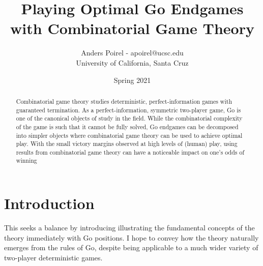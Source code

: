 \documentclass{article}
\title{Playing Optimal Go Endgames with Combinatorial Game Theory}
\author{Anders Poirel - apoirel@ucsc.edu \\ University of California, Santa Cruz}
\date{Spring 2021}
\theoremstyle{plain}
\theoremstyle{definition}
\begin{document}
\maketitle

\begin{abstract}
    Combinatorial game theory studies deterministic, perfect-information 
    games with guaranteed termination. As a perfect-information, symmetric 
    two-player game, Go is one of the canonical objects of study in the field.
    While the combinatorial complexity of the game is such that it cannot be fully solved,
    Go endgames can be decomposed into simpler objects where combinatorial game theory can 
    be used to achieve optimal play. With the small victory margins observed at high
    levels of (human) play, using results from combinatorial game theory can have a 
    noticeable impact on one's odds of winning 
\end{abstract}

\newpage
\tableofcontents
\newpage 

\section{Introduction}

This seeks a balance 
by introducing illustrating the fundamental concepts of the theory immediately 
with Go positions. I hope to convey how the theory naturally emerges from the rules 
of Go, despite being applicable to a much wider variety of two-player deterministic
games. 










\end{document}
